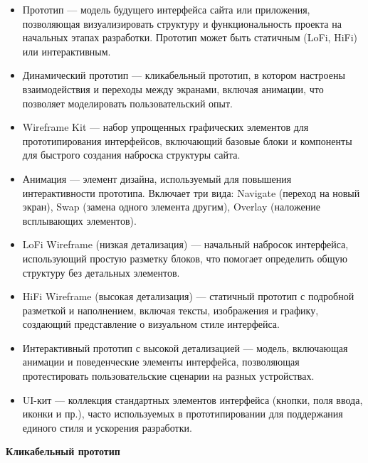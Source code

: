 \begin{itemize}
    \item Прототип — модель будущего интерфейса сайта или приложения, позволяющая визуализировать структуру и функциональность проекта на начальных этапах разработки. Прототип может быть статичным (LoFi, HiFi) или интерактивным.
    \item Динамический прототип — кликабельный прототип, в котором настроены взаимодействия и переходы между экранами, включая анимации, что позволяет моделировать пользовательский опыт.
    \item Wireframe Kit — набор упрощенных графических элементов для прототипирования интерфейсов, включающий базовые блоки и компоненты для быстрого создания наброска структуры сайта.
    \item Анимация — элемент дизайна, используемый для повышения интерактивности прототипа. Включает три вида: Navigate (переход на новый экран), Swap (замена одного элемента другим), Overlay (наложение всплывающих элементов).
    \item LoFi Wireframe (низкая детализация) — начальный набросок интерфейса, использующий простую разметку блоков, что помогает определить общую структуру без детальных элементов.
    \item HiFi Wireframe (высокая детализация) — статичный прототип с подробной разметкой и наполнением, включая тексты, изображения и графику, создающий представление о визуальном стиле интерфейса.
    \item Интерактивный прототип с высокой детализацией — модель, включающая анимации и поведенческие элементы интерфейса, позволяющая протестировать пользовательские сценарии на разных устройствах.
    \item UI-кит — коллекция стандартных элементов интерфейса (кнопки, поля ввода, иконки и пр.), часто используемых в прототипировании для поддержания единого стиля и ускорения разработки.
\end{itemize}
\bigskip

\textbf{Кликабельный прототип}
\bigskip

\noindent
\begin{minipage}{\linewidth}
\end{minipage}
\bigskip

